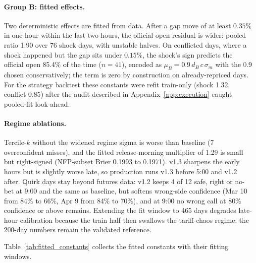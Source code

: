 \paragraph{Group B: fitted effects.}
Two deterministic effects are fitted from data. After a gap move of at
least $0.35\%$ in one hour within the last two hours, the official-open
residual is wider: pooled ratio 1.90 over 76 shock days, with unstable
halves. On conflicted days, where a shock happened but the gap sits under
$0.15\%$, the shock's sign predicts the official open 85.4\% of the
time ($n = 41$), encoded as $\mu_B = 0.9\,d_B\,c\,\sigma_m$ with the 0.9
chosen conservatively; the term is zero by construction on already-repriced
days. For the strategy backtest these constants were refit train-only
(shock 1.32, conflict 0.85) after the audit described in
Appendix~\ref{app:execution} caught pooled-fit look-ahead.

\paragraph{Regime ablations.}
Tercile-$k$ without the widened regime sigma is worse than baseline (7
overconfident misses), and the fitted release-morning multiplier of 1.29 is
small but right-signed (NFP-subset Brier 0.1993 to 0.1971). v1.3 sharpens the
early hours but is slightly worse late, so production runs v1.3 before 5:00
and v1.2 after. Quirk days stay beyond futures data: v1.2 keeps 4 of 12
safe, right or no-bet at 9:00 and the same as baseline, but softens wrong-side
confidence (Mar 10 from 84\% to 66\%, Apr 9 from 84\% to 70\%), and at 9:00
no wrong call at 80\% confidence or above remains. Extending the fit window
to 465 days degrades late-hour calibration because the train half then
swallows the tariff-chaos regime; the 200-day numbers remain the validated
reference.

Table~\ref{tab:fitted_constants} collects the fitted constants with their
fitting windows.

